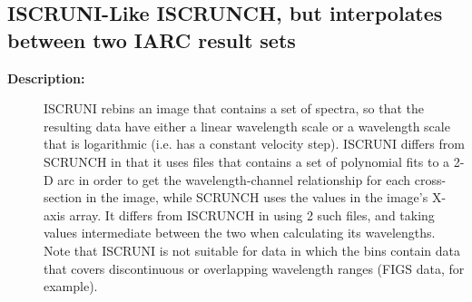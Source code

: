\subsection{ISCRUNI-\label{ISCRUNI}Like ISCRUNCH, but interpolates between two IARC result sets}
\begin{description}

\item [{\bf Description:}]
 ISCRUNI rebins an image that contains a set of spectra, so that
 the resulting data have either a linear wavelength scale or a
 wavelength scale that is logarithmic (i.e. has a constant velocity
 step).  ISCRUNI differs from SCRUNCH in that it uses  files that
 contains a set of polynomial fits to a 2-D arc in order to get the
 wavelength-channel relationship for each cross-section in the
 image, while SCRUNCH uses the values in the image's X-axis array.
 It differs from ISCRUNCH in using 2 such files, and taking values
 intermediate between the two when calculating its wavelengths.
 Note that ISCRUNI is not suitable for data in which the bins
 contain data that covers discontinuous or overlapping wavelength
 ranges (FIGS data, for example).


\end{description}
